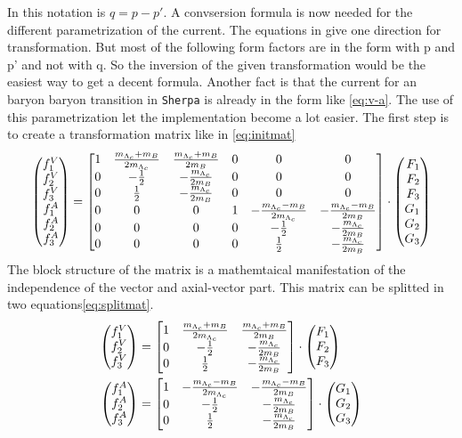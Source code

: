 In this notation is \(q = p - p'\). A convsersion formula is now needed for the 
different parametrization of the current. The equations in 
{\cite[Eq. 15]{form_factor_conversion}} give one direction for transformation. 
But most of the following form factors are in the form with p and p' and not 
with q. So the inversion of the given transformation would be the easiest 
way to get a decent formula. Another fact is that the current for an baryon 
baryon transition in \texttt{Sherpa} is already in the form like {\eqref{eq:v-a}}. 
The use of this parametrization let the implementation become a lot easier. 
The first step is to create a transformation matrix like in {\eqref{eq:initmat}}
\begin{equation}
  \Spvek{f^V_1; f^V_2; f^V_3; f^A_1; f^A_2; f^A_3} =
  \begin{bmatrix}
    1 & \frac{m_{\Lambda_c} + m_B }{2 m_{\Lambda_c}} & \frac{m_{\Lambda_c} + m_B }{2 m_B} & 0 & 0 & 0 \\
    0 & -\frac{1}{2} & -\frac{m_{\Lambda_c}}{2 m_B} & 0 & 0 & 0 \\
    0 & \frac{1}{2} & -\frac{m_{\Lambda_c}}{2 m_B} & 0 & 0 & 0 \\
    0 & 0 & 0 & 1 & -\frac{m_{\Lambda_c} - m_B }{2 m_{\Lambda_c}} & - \frac{m_{\Lambda_c} - m_B }{2 m_B} \\
    0 & 0 & 0 & 0 & -\frac{1}{2} & -\frac{m_{\Lambda_c}}{2 m_B} \\
    0 & 0 & 0 & 0 & \frac{1}{2} & -\frac{m_{\Lambda_c}}{2 m_B}
  \end{bmatrix}
  \cdot \Spvek{F_1; F_2; F_3; G_1; G_2; G_3} \label{eq:initmat}
\end{equation}
The block structure of the matrix is a mathemtaical manifestation of the 
independence of the vector and axial-vector part. This matrix can be splitted 
in two equations{\eqref{eq:splitmat}}.
\begin{align}
  \Spvek{f^V_1; f^V_2; f^V_3} & =
  \begin{bmatrix}
    1 & \frac{m_{\Lambda_c} + m_B }{2 m_{\Lambda_c}} & \frac{m_{\Lambda_c} + m_B }{2 m_B} \\
    0 & -\frac{1}{2} & -\frac{m_{\Lambda_c}}{2 m_B} \\
    0 & \frac{1}{2} & -\frac{m_{\Lambda_c}}{2 m_B} \\
  \end{bmatrix}
  \cdot \Spvek{F_1; F_2; F_3} \nonumber \\
  \Spvek{f^A_1; f^A_2; f^A_3} & =
  \begin{bmatrix}
    1 & -\frac{m_{\Lambda_c} - m_B }{2 m_{\Lambda_c}} & - \frac{m_{\Lambda_c} - m_B }{2 m_B} \\
    0 & -\frac{1}{2} & -\frac{m_{\Lambda_c}}{2 m_B} \\
    0 & \frac{1}{2} & -\frac{m_{\Lambda_c}}{2 m_B}
  \end{bmatrix}
  \cdot \Spvek{G_1; G_2; G_3} \label{eq:splitmat}
\end{align}
